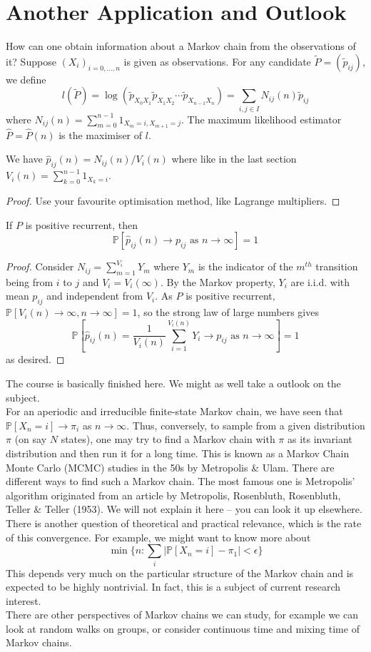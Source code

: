 \section{Another Application and Outlook}
How can one obtain information about a Markov chain from the observations of it?
Suppose $(X_i)_{i=0,\ldots,n}$ is given as observations.
For any candidate $\tilde{P}=(\tilde{p}_{ij})$, we define
$$l(\tilde{P})=\log(\tilde{p}_{X_0X_1}\tilde{p}_{X_1X_2}\cdots\tilde{p}_{X_{n-1}X_n})=\sum_{i,j\in I}N_{ij}(n)\tilde{p}_{ij}$$
where $N_{ij}(n)=\sum_{m=0}^{n-1}1_{X_m=i,X_{m+1}=j}$.
The maximum likelihood estimator $\hat{P}=\hat{P}(n)$ is the maximiser of $l$.
\begin{lemma}
    We have $\hat{p}_{ij}(n)=N_{ij}(n)/V_i(n)$ where like in the last section $V_i(n)=\sum_{k=0}^{n-1}1_{X_k=i}$.
\end{lemma}
\begin{proof}
    Use your favourite optimisation method, like Lagrange multipliers.
\end{proof}
\begin{theorem}
    If $P$ is positive recurrent, then
    $$\mathbb P[\hat{p}_{ij}(n)\to p_{ij}\text{ as }n\to\infty]=1$$
\end{theorem}
\begin{proof}
    Consider $N_{ij}=\sum_{m=1}^{V_i}Y_m$ where $Y_m$ is the indicator of the $m^{th}$ transition being from $i$ to $j$ and $V_i=V_i(\infty)$.
    By the Markov property, $Y_i$ are i.i.d. with mean $p_{ij}$ and independent from $V_i$.
    As $P$ is positive recurrent, $\mathbb P[V_i(n)\to\infty,n\to\infty]=1$, so the strong law of large numbers gives
    $$\mathbb P\left[ \hat{p}_{ij}(n)=\frac{1}{V_i(n)}\sum_{i=1}^{V_i(n)}Y_i\to p_{ij}\text{ as }n\to\infty \right]=1$$
    as desired.
\end{proof}
The course is basically finished here.
We might as well take a outlook on the subject.\\
For an aperiodic and irreducible finite-state Markov chain, we have seen that $\mathbb P[X_n=i]\to\pi_i$ as $n\to\infty$.
Thus, conversely, to sample from a given distribution $\pi$ (on say $N$ states), one may try to find a Markov chain with $\pi$ as its invariant distribution and then run it for a long time.
This is known as a Markov Chain Monte Carlo (MCMC) studies in the 50s by Metropolis \& Ulam.
There are different ways to find such a Markov chain.
The most famous one is Metropolis' algorithm originated from an article by Metropolis, Rosenbluth, Rosenbluth, Teller \& Teller (1953).
We will not explain it here -- you can look it up elsewhere.\\
There is another question of theoretical and practical relevance, which is the rate of this convergence.
For example, we might want to know more about
$$\min\{n:\sum_i|\mathbb P[X_n=i]-\pi_1|<\epsilon\}$$
This depends very much on the particular structure of the Markov chain and is expected to be highly nontrivial.
In fact, this is a subject of current research interest.\\
There are other perspectives of Markov chains we can study, for example we can look at random walks on groups, or consider continuous time and mixing time of Markov chains.